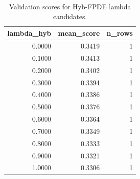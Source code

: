 \begin{table}[t]
\caption{Validation scores for Hyb-FPDE lambda candidates.}
\label{tab:lambda_distribution_computed}
\centering
\begin{tabular}{rrr}
\toprule
lambda\_hyb & mean\_score & n\_rows \\
\midrule
0.0000 & 0.3419 & 1 \\
0.1000 & 0.3413 & 1 \\
0.2000 & 0.3402 & 1 \\
0.3000 & 0.3394 & 1 \\
0.4000 & 0.3386 & 1 \\
0.5000 & 0.3376 & 1 \\
0.6000 & 0.3364 & 1 \\
0.7000 & 0.3349 & 1 \\
0.8000 & 0.3333 & 1 \\
0.9000 & 0.3321 & 1 \\
1.0000 & 0.3306 & 1 \\
\bottomrule
\end{tabular}

\end{table}

